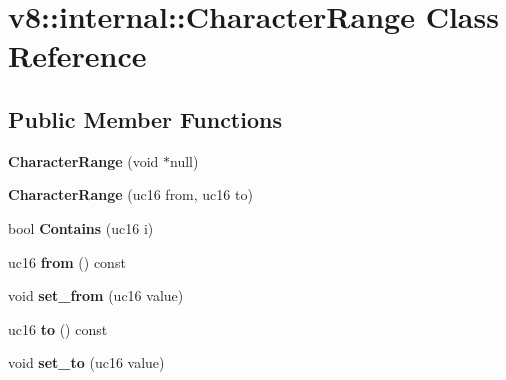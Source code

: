 \hypertarget{classv8_1_1internal_1_1_character_range}{}\section{v8\+:\+:internal\+:\+:Character\+Range Class Reference}
\label{classv8_1_1internal_1_1_character_range}
\subsection*{Public Member Functions}
\begin{DoxyCompactItemize}
\item 
\hypertarget{classv8_1_1internal_1_1_character_range_a1c257176d47561b468f2d9fcba3768ee}{}{\bfseries Character\+Range} (void $\ast$null)\label{classv8_1_1internal_1_1_character_range_a1c257176d47561b468f2d9fcba3768ee}

\item 
\hypertarget{classv8_1_1internal_1_1_character_range_a583aebc6df8610da61fef84f4c872e81}{}{\bfseries Character\+Range} (uc16 from, uc16 to)\label{classv8_1_1internal_1_1_character_range_a583aebc6df8610da61fef84f4c872e81}

\item 
\hypertarget{classv8_1_1internal_1_1_character_range_a37312a8d39b8f38fbe0dfd9f5931d08e}{}bool {\bfseries Contains} (uc16 i)\label{classv8_1_1internal_1_1_character_range_a37312a8d39b8f38fbe0dfd9f5931d08e}

\item 
\hypertarget{classv8_1_1internal_1_1_character_range_ad9792ba2ab9618890143e2b0507a78de}{}uc16 {\bfseries from} () const \label{classv8_1_1internal_1_1_character_range_ad9792ba2ab9618890143e2b0507a78de}

\item 
\hypertarget{classv8_1_1internal_1_1_character_range_a45c58e57326a141659a68fe0d2440fd9}{}void {\bfseries set\+\_\+from} (uc16 value)\label{classv8_1_1internal_1_1_character_range_a45c58e57326a141659a68fe0d2440fd9}

\item 
\hypertarget{classv8_1_1internal_1_1_character_range_a77f4a9930d38299cc4ef6d08b9cccf06}{}uc16 {\bfseries to} () const \label{classv8_1_1internal_1_1_character_range_a77f4a9930d38299cc4ef6d08b9cccf06}

\item 
\hypertarget{classv8_1_1internal_1_1_character_range_a569b84040aea21af2928197e0ee900d6}{}void {\bfseries set\+\_\+to} (uc16 value)\label{classv8_1_1internal_1_1_character_range_a569b84040aea21af2928197e0ee900d6}


\end{DoxyCompactItemize}
